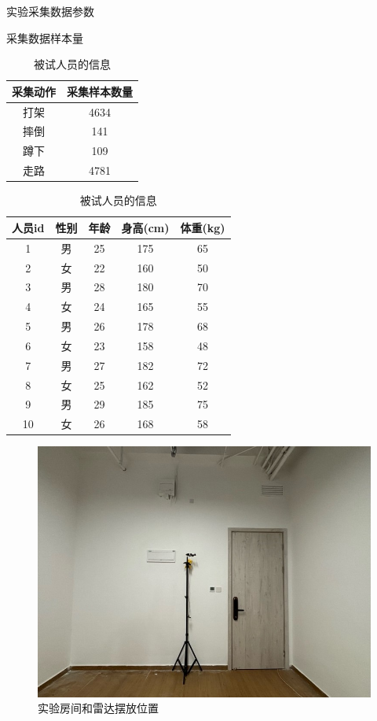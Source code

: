 \begin{table}[htbp]
    \caption{实验采集数据参数}
	\label{tab:collection params}
	\begin{subtable}{.4\linewidth}
        \label{sample quantity}
		\centering
		\caption{采集数据样本量}
		\begin{tabular}{cc}
			\toprule
		    采集动作 & 采集样本数量  \\
			\midrule
			打架 & 4634 \\
			摔倒 & 141 \\
			蹲下 & 109 \\
			走路 & 4781 \\
			\bottomrule
		\end{tabular}
	\end{subtable}
	\begin{subtable}{.4\linewidth}
		\centering
		\caption{被试人员的信息}
		\begin{tabular}{ccccc}
			\toprule
			人员id &  性别 & 年龄 & 身高(cm) & 体重(kg)  \\
			\midrule
			1 & 男 & 25 & 175 & 65 \\
			2 & 女 & 22 & 160 & 50 \\
			3 & 男 & 28 & 180 & 70 \\
			4 & 女 & 24 & 165 & 55 \\
			5 & 男 & 26 & 178 & 68 \\
			6 & 女 & 23 & 158 & 48 \\
			7 & 男 & 27 & 182 & 72 \\
			8 & 女 & 25 & 162 & 52 \\
			9 & 男 & 29 & 185 & 75 \\
			10 & 女 & 26 & 168 & 58 \\
			\bottomrule
		\end{tabular}
	\end{subtable}  
\end{table}
\begin{figure}[htbp]
    \centering
    \includegraphics[width=0.5\linewidth]{imgs/experiment room and radar.jpg}
    \caption{实验房间和雷达摆放位置}
    \label{fig:experiment room and radar}
\end{figure}
